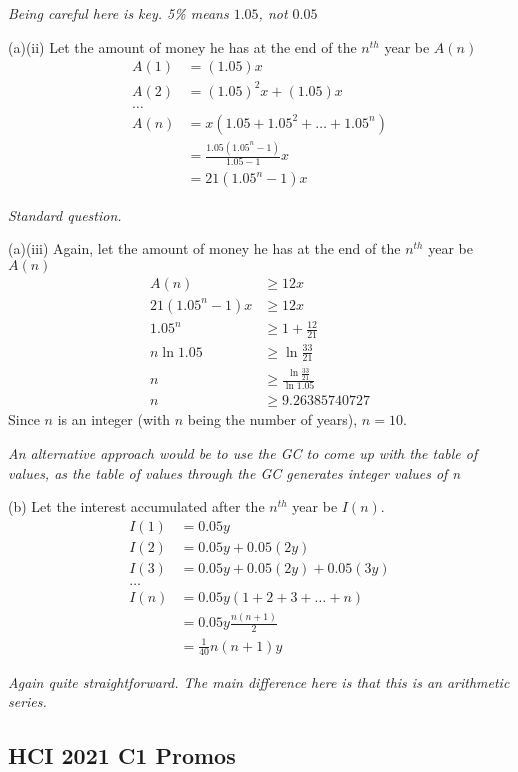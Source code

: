 \documentclass[12pt, a4paper, titlepage]{article}
\begin{document}
\emph{Being careful here is key. 5\% means $1.05$, not $0.05$}

(a)(ii)
Let the amount of money he has at the end of the $n^{th}$ year be $A(n)$
\begin{align*}
    A(1) &= (1.05)x \\
    A(2) &= (1.05)^2x + (1.05)x \\
    \dots \\
    A(n) &= x(1.05 + 1.05^2 + \dots + 1.05^n) \\
    &= \frac{1.05(1.05^n - 1)}{1.05 - 1}x \\
    &= 21(1.05^n - 1)x
\end{align*}

\emph{Standard question.}

(a)(iii)
Again, let the amount of money he has at the end of the $n^{th}$ year be $A(n)$
\begin{align*}
    A(n) &\ge 12x \\
    21(1.05^n - 1)x &\ge 12x \\
    1.05^n &\ge 1 + \frac{12}{21} \\
    n \ln 1.05 &\ge \ln \frac{33}{21} \\
    n&\ge \frac{\ln \frac{33}{21}}{\ln 1.05} \\
    n &\ge 9.26385740727
\end{align*}
Since $n$ is an integer (with $n$ being the number of years), $n = 10$.

\emph{An alternative approach would be to use the GC to come up with the table of values, as the table of values through the GC generates integer values of n}

(b)
Let the interest accumulated after the $n^{th}$ year be $I(n)$.
\begin{align*}
    I(1) &= 0.05y \\
    I(2) &= 0.05y + 0.05(2y) \\
    I(3) &= 0.05y + 0.05(2y) + 0.05(3y) \\
    \dots \\
    I(n) &= 0.05y(1 + 2 + 3 + \dots + n) \\
    &= 0.05y\frac{n(n + 1)}{2} \\
    &= \frac{1}{40}n(n + 1)y
\end{align*}

\emph{Again quite straightforward. The main difference here is that this is an arithmetic series.}


\subsection{HCI 2021 C1 Promos}
\end{document}
